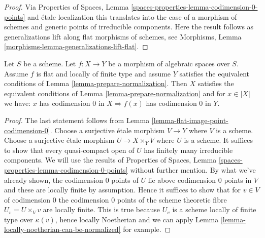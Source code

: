 \begin{proof}
Via Properties of Spaces, Lemma
\ref{spaces-properties-lemma-codimension-0-points} and \'etale localization
this translates into the case of a morphism of schemes and generic points
of irreducible components. Here the result follows as generalizations lift
along flat morphisms of schemes, see
Morphisms, Lemma \ref{morphisms-lemma-generalizations-lift-flat}.
\end{proof}

\begin{lemma}
\label{lemma-flat-locally-finite-type-points-codimension-0}
Let $S$ be a scheme. Let $f : X \to Y$ be a morphism of algebraic
spaces over $S$. Assume $f$ is flat and locally of finite type and
assume $Y$ satisfies the equivalent conditions of
Lemma \ref{lemma-prepare-normalization}.
Then $X$ satisfies the equivalent conditions of
Lemma \ref{lemma-prepare-normalization} and for $x \in |X|$ we have:
$x$ has codimension $0$ in $X \Rightarrow f(x)$ has codimension $0$ in $Y$.
\end{lemma}

\begin{proof}
The last statement follows from
Lemma \ref{lemma-flat-image-point-codimension-0}.
Choose a surjective \'etale morphism $V \to Y$ where $V$ is a scheme.
Choose a surjective \'etale morphism $U \to X \times_Y V$ where $U$
is a scheme. It suffices to show that every quasi-compact open
of $U$ has finitely many irreducible components.
We will use the results of
Properties of Spaces, Lemma \ref{spaces-properties-lemma-codimension-0-points}
without further mention. By what we've
already shown, the codimension $0$ points of $U$ lie above
codimension $0$ points in $V$ and these are locally finite by
assumption. Hence it suffices to show that for $v \in V$ of codimension $0$
the codimension $0$ points of the scheme theoretic fibre $U_v = U \times_V v$
are locally finite. This is true because $U_v$ is a scheme
locally of finite type over $\kappa(v)$, hence locally Noetherian
and we can apply Lemma \ref{lemma-locally-noetherian-can-be-normalized}
for example.
\end{proof}

